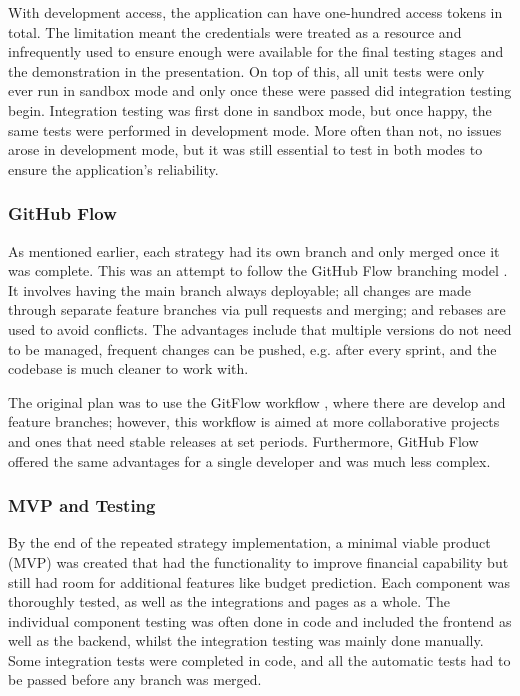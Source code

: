 With development access, the application can have one-hundred access tokens in total. The limitation meant the credentials were treated as a resource and infrequently used to ensure enough were available for the final testing stages and the demonstration in the presentation. On top of this, all unit tests were only ever run in sandbox mode and only once these were passed did integration testing begin. Integration testing was first done in sandbox mode, but once happy, the same tests were performed in development mode. More often than not, no issues arose in development mode, but it was still essential to test in both modes to ensure the application's reliability.


\subsubsection{GitHub Flow}
\label{sec:github-flow}
As mentioned earlier, each strategy had its own branch and only merged once it was complete. This was an attempt to follow the GitHub Flow branching model \cite{GitHubFlow}. It involves having the main branch always deployable; all changes are made through separate feature branches via pull requests and merging; and rebases are used to avoid conflicts. The advantages include that multiple versions do not need to be managed, frequent changes can be pushed, e.g. after every sprint, and the codebase is much cleaner to work with.

The original plan was to use the GitFlow workflow \cite{GitFlow}, where there are develop and feature branches; however, this workflow is aimed at more collaborative projects and ones that need stable releases at set periods. Furthermore, GitHub Flow offered the same advantages for a single developer and was much less complex.

\subsubsection{MVP and Testing}
By the end of the repeated strategy implementation, a minimal viable product (MVP) was created that had the functionality to improve financial capability but still had room for additional features like budget prediction. Each component was thoroughly tested, as well as the integrations and pages as a whole. The individual component testing was often done in code and included the frontend as well as the backend, whilst the integration testing was mainly done manually. Some integration tests were completed in code, and all the automatic tests had to be passed before any branch was merged.

